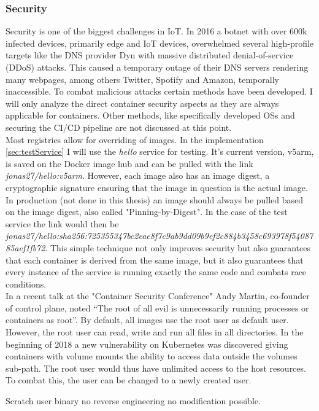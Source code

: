 \subsubsection{Security}
Security is one of the biggest challenges in IoT. In 2016 a botnet with over 600k infected devices, primarily edge and IoT devices, overwhelmed several high-profile targets like the DNS provider Dyn with massive distributed denial-of-service (DDoS) attacks. This caused a temporary outage of their DNS servers rendering many webpages, among others  Twitter, Spotify and Amazon, temporally inaccessible. To combat malicious attacks certain methods have been developed. I will only analyze the direct container security aspects as they are always applicable for containers. Other methods, like specifically developed OSs and securing the CI/CD pipeline are not discussed at this point.\\
Most registries allow for overriding of images. In the implementation \cref{sec:testService}  I will use the \textit{hello} service for testing. It's current version, v5arm, is saved on the Docker image hub and can be pulled with the link \textit{jonas27/hello:v5arm}. However, each image also has an image digest, a cryptographic signature ensuring that the image in question is the actual image. In production (not done in this thesis) an image should always be pulled based on the image digest, also called "Pinning-by-Digest". In the case of the test service the link would then be \textit{jonas27/hello:sha256:725355347bc2eae8f7c9ab9dd09b9ef2c884b3458c693978f5408785aef1fb72}. This simple technique not only improves security but also guarantees that each container is derived from the same image, but it also guarantees that every instance of the service is running exactly the same code and combats race conditions.\\
In a recent talk at the "Container Security Conference" Andy Martin, co-founder of control plane, noted ``The root of all evil is unnecessarily running processes or containers as root''\cite{RootlessContainerSecurityTalk0:online}. By default, all images use the root user as default user. However, the root user can read, write and run all files in all directories. In the beginning of 2018 a new vulnerability on Kubernetes was discovered giving containers with volume mounts the ability to access data outside the volumes sub-path. The root user would thus have unlimited access to the host resources. To combat this, the user can be changed to a newly created user. 

Scratch user
binary no reverse engineering
no modification possible.